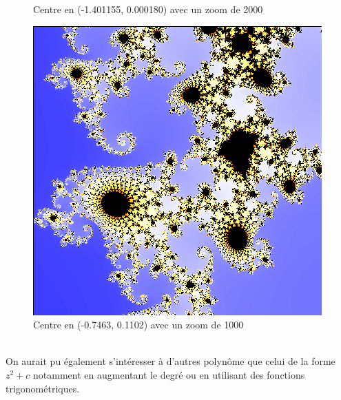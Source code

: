 \begin{figure}[h]
\begin{minipage}[b]{0.3\textwidth}
                    \caption{Centre en (-1.401155, 0.000180) avec un zoom de 2000}
                    \label{fig:mandel3}
                \end{minipage}
                \hfill
                \begin{minipage}[b]{0.3\textwidth}
                    \includegraphics[width=\textwidth]{images/Mandelbrot1(-0.7463, 0.1102, 1000).png}
                    \caption{Centre en (-0.7463, 0.1102) avec un zoom de 1000}
                    \label{fig:mandel4}
                \end{minipage}
            \end{figure}
            \\
            On aurait pu également s'intéresser à d'autres polynôme que celui de la forme $z^2+c$ notamment en augmentant le degré ou en utilisant des fonctions trigonométriques.
            \newpage
